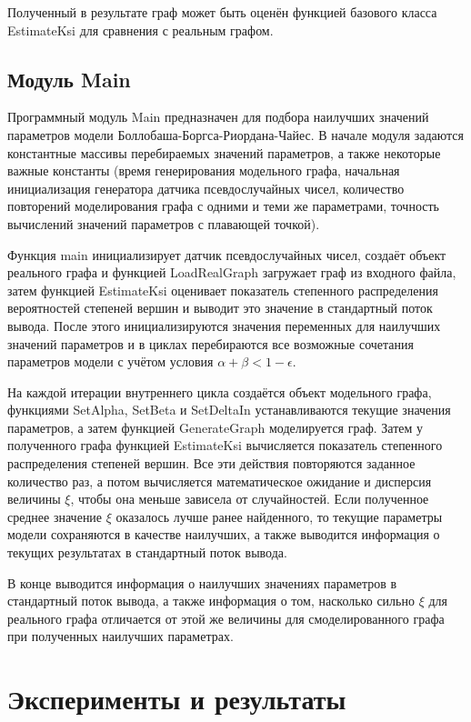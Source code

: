 \documentclass[14pt]{extreport}
\begin{document}
Полученный в результате граф может быть оценён функцией базового класса EstimateKsi для сравнения с реальным графом.

\section{Модуль Main}

Программный модуль Main предназначен для подбора наилучших значений параметров модели Боллобаша-Боргса-Риордана-Чайес. В начале модуля задаются константные массивы перебираемых значений параметров, а также некоторые важные константы (время генерирования модельного графа, начальная инициализация генератора датчика псевдослучайных чисел, количество повторений моделирования графа с одними и теми же параметрами, точность вычислений значений параметров с плавающей точкой).

Функция main инициализирует датчик псевдослучайных чисел, создаёт объект реального графа и функцией LoadRealGraph загружает граф из входного файла, затем функцией EstimateKsi оценивает показатель степенного распределения вероятностей степеней вершин и выводит это значение в стандартный поток вывода. После этого инициализируются значения переменных для наилучших значений параметров и в циклах перебираются все возможные сочетания параметров модели с учётом условия $\alpha + \beta < 1 - \epsilon$.

На каждой итерации внутреннего цикла создаётся объект модельного графа, функциями SetAlpha, SetBeta и SetDeltaIn устанавливаются текущие значения параметров, а затем функцией GenerateGraph моделируется граф. Затем у полученного графа функцией EstimateKsi вычисляется показатель степенного распределения степеней вершин. Все эти действия повторяются заданное количество раз, а потом вычисляется математическое ожидание и дисперсия величины $\xi$, чтобы она меньше зависела от случайностей. Если полученное среднее значение $\xi$ оказалось лучше ранее найденного, то текущие параметры модели сохраняются в качестве наилучших, а также выводится информация о текущих результатах в стандартный поток вывода.

В конце выводится информация о наилучших значениях параметров в стандартный поток вывода, а также информация о том, насколько сильно $\xi$ для реального графа отличается от этой же величины для смоделированного графа при полученных наилучших параметрах.

\chapter{Эксперименты и результаты}
\end{document}
